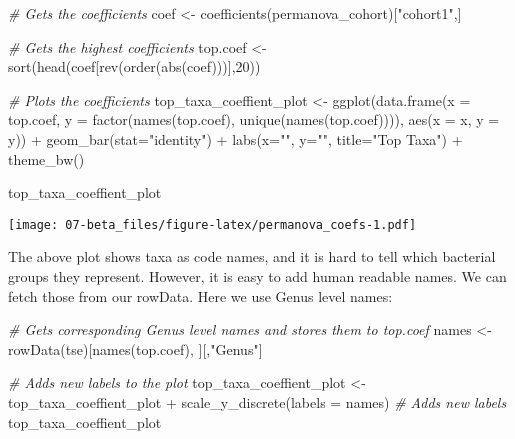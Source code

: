 \documentclass[
  oneside]{book}
\newenvironment{Shaded}{\begin{snugshade}}{\end{snugshade}}
\newcommand{\AttributeTok}[1]{\textcolor[rgb]{0.77,0.63,0.00}{#1}}
\newcommand{\CommentTok}[1]{\textcolor[rgb]{0.56,0.35,0.01}{\textit{#1}}}
\newcommand{\DecValTok}[1]{\textcolor[rgb]{0.00,0.00,0.81}{#1}}
\newcommand{\FunctionTok}[1]{\textcolor[rgb]{0.00,0.00,0.00}{#1}}
\newcommand{\NormalTok}[1]{#1}
\newcommand{\OtherTok}[1]{\textcolor[rgb]{0.56,0.35,0.01}{#1}}
\newcommand{\SpecialCharTok}[1]{\textcolor[rgb]{0.00,0.00,0.00}{#1}}
\newcommand{\StringTok}[1]{\textcolor[rgb]{0.31,0.60,0.02}{#1}}
\begin{document}
\begin{Shaded}
\begin{Highlighting}[]
\CommentTok{\# Gets the coefficients}
\NormalTok{coef }\OtherTok{\textless{}{-}} \FunctionTok{coefficients}\NormalTok{(permanova\_cohort)[}\StringTok{"cohort1"}\NormalTok{,]}

\CommentTok{\# Gets the highest coefficients}
\NormalTok{top.coef }\OtherTok{\textless{}{-}} \FunctionTok{sort}\NormalTok{(}\FunctionTok{head}\NormalTok{(coef[}\FunctionTok{rev}\NormalTok{(}\FunctionTok{order}\NormalTok{(}\FunctionTok{abs}\NormalTok{(coef)))],}\DecValTok{20}\NormalTok{))}

\CommentTok{\# Plots the coefficients}
\NormalTok{top\_taxa\_coeffient\_plot }\OtherTok{\textless{}{-}} \FunctionTok{ggplot}\NormalTok{(}\FunctionTok{data.frame}\NormalTok{(}\AttributeTok{x =}\NormalTok{ top.coef,}
                                             \AttributeTok{y =} \FunctionTok{factor}\NormalTok{(}\FunctionTok{names}\NormalTok{(top.coef),}
                         \FunctionTok{unique}\NormalTok{(}\FunctionTok{names}\NormalTok{(top.coef)))),}
                                  \FunctionTok{aes}\NormalTok{(}\AttributeTok{x =}\NormalTok{ x, }\AttributeTok{y =}\NormalTok{ y)) }\SpecialCharTok{+}
  \FunctionTok{geom\_bar}\NormalTok{(}\AttributeTok{stat=}\StringTok{"identity"}\NormalTok{) }\SpecialCharTok{+}
  \FunctionTok{labs}\NormalTok{(}\AttributeTok{x=}\StringTok{""}\NormalTok{, }\AttributeTok{y=}\StringTok{""}\NormalTok{, }\AttributeTok{title=}\StringTok{"Top Taxa"}\NormalTok{) }\SpecialCharTok{+}
  \FunctionTok{theme\_bw}\NormalTok{()}

\NormalTok{top\_taxa\_coeffient\_plot}
\end{Highlighting}
\end{Shaded}

\texttt{[image: 07-beta\_files/figure-latex/permanova\_coefs-1.pdf]}

The above plot shows taxa as code names, and it is hard to tell which
bacterial groups they represent. However, it is easy to add human readable
names. We can fetch those from our rowData. Here we use Genus level names:

\begin{Shaded}
\begin{Highlighting}[]
\CommentTok{\# Gets corresponding Genus level names and stores them to top.coef}
\NormalTok{names }\OtherTok{\textless{}{-}} \FunctionTok{rowData}\NormalTok{(tse)[}\FunctionTok{names}\NormalTok{(top.coef), ][,}\StringTok{"Genus"}\NormalTok{]}

\CommentTok{\# Adds new labels to the plot}
\NormalTok{top\_taxa\_coeffient\_plot }\OtherTok{\textless{}{-}}\NormalTok{ top\_taxa\_coeffient\_plot }\SpecialCharTok{+}
  \FunctionTok{scale\_y\_discrete}\NormalTok{(}\AttributeTok{labels =}\NormalTok{ names) }\CommentTok{\# Adds new labels}
\NormalTok{top\_taxa\_coeffient\_plot}
\end{Highlighting}
\end{Shaded}
\end{document}
